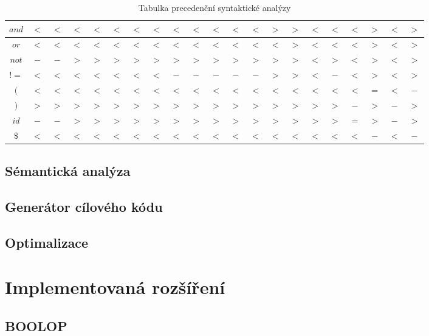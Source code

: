 \documentclass[12pt]{article}
\begin{document}
\begin{table}[!htbp]
\begin{tabular}{|c|c|c|c|c|c|c|c|c|c|c|c|c|c|c|c|c|c|c|c|c|}
    \hline
        $and$ & $<$ & $<$ & $<$ & $<$ & $<$ & $<$ & $<$ & $<$ & $<$ & $<$ & $<$ & $<$ & $>$ & $>$ & $<$ & $<$ & $<$ & $>$ & $<$ & $>$\\
    \hline
        $or$ & $<$ & $<$ & $<$ & $<$ & $<$ & $<$ & $<$ & $<$ & $<$ & $<$ & $<$ & $<$ & $<$ & $>$ & $<$ & $<$ & $<$ & $>$ & $<$ & $>$\\
    \hline
        $not$ & $-$ & $-$ & $>$ & $>$ & $>$ & $>$ & $>$ & $>$ & $>$ & $>$ & $>$ & $>$ & $>$ & $>$ & $<$ & $>$ & $<$ & $>$ & $<$ & $>$\\
    \hline
        $!=$ & $<$ & $<$ & $<$ & $<$ & $<$ & $<$ & $<$ & $-$ & $-$ & $-$ & $-$ & $-$ & $>$ & $>$ & $<$ & $-$ & $<$ & $>$ & $<$ & $>$\\
    \hline
        $($ & $<$ & $<$ & $<$ & $<$ & $<$ & $<$ & $<$ & $<$ & $<$ & $<$ & $<$ & $<$ & $<$ & $<$ & $<$ & $<$ & $<$ & $=$ & $<$ & $-$\\
    \hline
        $)$ & $>$ & $>$ & $>$ & $>$ & $>$ & $>$ & $>$ & $>$ & $>$ & $>$ & $>$ & $>$ & $>$ & $>$ & $>$ & $>$ & $-$ & $>$ & $-$ & $>$\\
    \hline
        $id$ & $-$ & $-$ & $>$ & $>$ & $>$ & $>$ & $>$ & $>$ & $>$ & $>$ & $>$ & $>$ & $>$ & $>$ & $>$ & $>$ & $=$ & $>$ & $-$ & $>$\\
    \hline
        $\$$ & $<$ & $<$ & $<$ & $<$ & $<$ & $<$ & $<$ & $<$ & $<$ & $<$ & $<$ & $<$ & $<$ & $<$ & $<$ & $<$ & $<$ & $-$ & $<$ & $-$\\
    \hline
    \end{tabular}
    \caption{Tabulka precedenční syntaktické analýzy}
    \label{tab:2}
\end{table}

\subsection{Sémantická analýza}
\subsection{Generátor cílového kódu}
\subsection{Optimalizace}
\section{Implementovaná rozšíření}
\subsection{BOOLOP}
\end{document}
